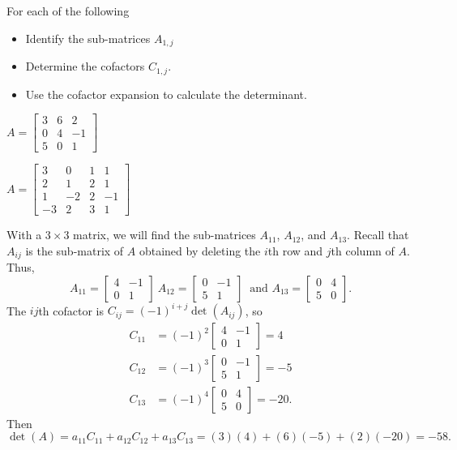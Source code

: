 \begin{example} For each of the following
\begin{itemize}
\item Identify the sub-matrices $A_{1,j}$
\item Determine the cofactors $C_{1,j}$.
\item Use the cofactor expansion to calculate the determinant.
\end{itemize}
 
\ba
\item $A = \left[ \begin{array}{ccr} 3&6&2 \\ 0&4&-1 \\ 5&0&1  \end{array} \right]$

\item $A = \left[ \begin{array}{rrcr} 3&0&1&1 \\ 2&1&2&1 \\ 1&-2&2&-1 \\ -3&2&3&1  \end{array} \right]$

\ea

\ExampleSolution

\ba
\item With a $3 \times 3$ matrix, we will find the sub-matrices $A_{11}$, $A_{12}$, and $A_{13}$. Recall that $A_{ij}$ is the sub-matrix of $A$ obtained by deleting the $i$th row and $j$th column of $A$. Thus,
\[A_{11} =  \left[ \begin{array}{cr} 4&-1 \\ 0&1  \end{array} \right] \ 
A_{12} =  \left[ \begin{array}{cr} 0&-1 \\ 5&1  \end{array} \right] \ \text{ and } 
A_{13} =  \left[ \begin{array}{cc} 0&4 \\ 5&0  \end{array} \right].
\]
The $ij$th cofactor is $C_{ij} = (-1)^{i+j}\det(A_{ij})$, so
\begin{align*}
C_{11} &= (-1)^2 \left[ \begin{array}{cr} 4&-1 \\ 0&1  \end{array} \right] = 4 \\
C_{12} &= (-1)^3 \left[ \begin{array}{cr} 0&-1 \\ 5&1  \end{array} \right] = -5 \\
C_{13} &= (-1)^4 \left[ \begin{array}{cc} 0&4 \\ 5&0  \end{array} \right] = -20.
\end{align*}
Then
\[\det(A) = a_{11}C_{11} + a_{12}C_{12} + a_{13}C_{13} = (3)(4) +(6)(-5) +(2)(-20) = -58.\]


\end{example}
